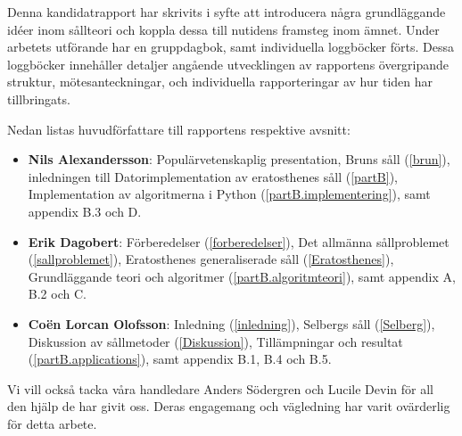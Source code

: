Denna kandidatrapport har skrivits i syfte att introducera några grundläggande idéer inom sållteori och koppla dessa till nutidens framsteg inom ämnet.
Under arbetets utförande har en gruppdagbok, samt individuella loggböcker förts.
Dessa loggböcker innehåller detaljer angående utvecklingen av rapportens övergripande struktur, mötesanteckningar, och individuella rapporteringar av hur tiden har tillbringats.

Nedan listas huvudförfattare till rapportens respektive avsnitt:
\begin{itemize}
    \item \textbf{Nils Alexandersson}: 
        Populärvetenskaplig presentation,
        Bruns såll (\ref{brun}),
        inledningen till Datorimplementation av eratosthenes såll (\ref{partB}),
        Implementation av algoritmerna i Python (\ref{partB.implementering}),
        samt appendix B.3 och D.
    \item \textbf{Erik Dagobert}: 
        Förberedelser (\ref{forberedelser}), 
        Det allmänna sållproblemet (\ref{sallproblemet}), 
        Eratosthenes generaliserade såll (\ref{Eratosthenes}),
        Grundläggande teori och algoritmer (\ref{partB.algoritmteori}),
        samt appendix A, B.2 och C.
    \item \textbf{Coën Lorcan Olofsson}:
        Inledning (\ref{inledning}), 
        Selbergs såll (\ref{Selberg}),
        Diskussion av sållmetoder (\ref{Diskussion}),
        Tillämpningar och resultat (\ref{partB.applications}),
        samt appendix B.1, B.4 och B.5.
\end{itemize}
Vi vill också tacka våra handledare Anders Södergren och Lucile Devin för all den hjälp de har givit oss. 
Deras engagemang och vägledning har varit ovärderlig för detta arbete.